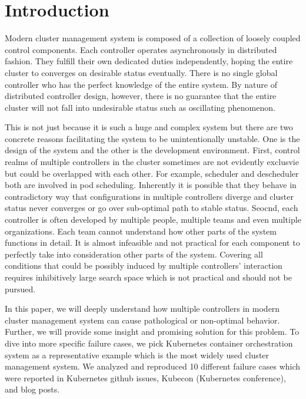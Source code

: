 \section{Introduction}
\label{sec:introduction}
Modern cluster management system is composed of a collection of loosely coupled control components. Each controller operates asynchronously in distributed fashion. They fulfill their own dedicated duties independently, hoping the entire cluster to converges on desirable status eventually. There is no single global controller who has the perfect knowledge of the entire system. By nature of distributed controller design, however, there is no guarantee that the entire cluster will not fall into undesirable status such as oscillating phenomenon. 

This is not just because it is such a huge and complex system but there are two concrete reasons facilitating the system to be unintentionally unstable. One is the design of the system and the other is the development environment. First, control realms of multiple controllers in the cluster sometimes are not evidently exclusvie but could be overlapped with each other. For example, scheduler and descheduler both are involved in pod scheduling. Inherently it is possible that they behave in contradictory way that configurations in multiple controllers diverge and cluster status never converges or go over sub-optimal path to stable status.
Seocnd, each controller is often developed by multiple people, multiple teams and even multiple organizations. Each team cannot understand how other parts of the system functions in detail. It is almost infeasible and not practical for each component to perfectly take into consideration other parts of the system. Covering all conditions that could be possibly induced by multiple controllers' interaction requires inhibitively large search space which is not practical and should not be pursued.

In this paper, we will deeply understand how multiple controllers in modern cluster management system can cause pathological or non-optimal behavior. Further, we will provide some insight and promising solution for this problem. To dive into more specific failure cases, we pick Kubernetes container orchestration system as a representative example which is the most widely used cluster management system. We analyzed and reproduced 10 different failure cases which were reported in Kubernetes github issues, Kubecon (Kubernetes conference), and blog posts.
